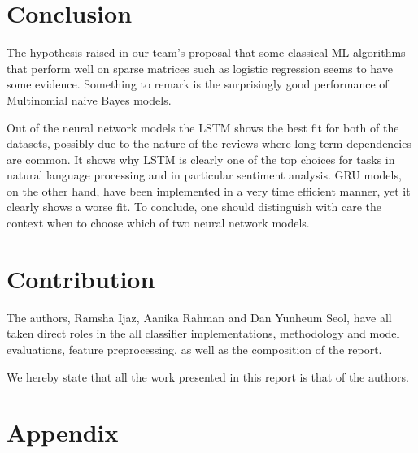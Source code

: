 \documentclass[comsoc,conference]{IEEEtran}
\begin{document}
\section{Conclusion}
\par The hypothesis raised in our team's proposal that some classical ML algorithms that perform well on sparse matrices such as logistic regression seems to have some evidence. Something to remark is the surprisingly good performance of Multinomial naive Bayes models.
\par Out of the neural network models the LSTM shows the best fit for both of the datasets, possibly due to the nature of the reviews where long term dependencies are common. It shows why LSTM is clearly one of the top choices for tasks in natural language processing and in particular sentiment analysis. GRU models, on the other hand, have been implemented in a very time efficient manner, yet it clearly shows a worse fit. To conclude, one should distinguish with care the context when  to choose which  of two neural network models.



\newpage
\section{Contribution} 
The authors, Ramsha Ijaz, Aanika Rahman and Dan Yunheum Seol, have all taken direct roles in the all classifier implementations, methodology and model evaluations, feature preprocessing, as well as the composition of the report. 

We hereby state that all the work presented in this report is that of the authors.

\section*{Appendix}



\end{document}
